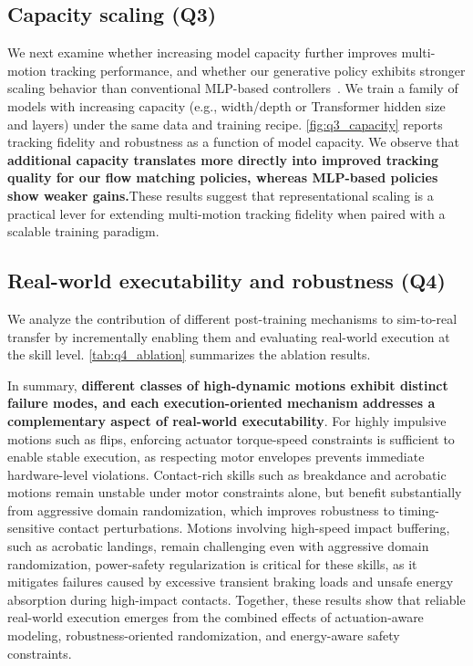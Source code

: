 

\subsection{Capacity scaling (Q3)}
\label{sec:q3_capacity}

We next examine whether increasing model capacity further improves multi-motion tracking performance, and whether our generative policy exhibits stronger scaling behavior than conventional MLP-based controllers~\cite{pan2025much}.
We train a family of models with increasing capacity (e.g., width/depth or Transformer hidden size and layers) under the same data and training recipe.
\cref{fig:q3_capacity} reports tracking fidelity and robustness as a function of model capacity.
We observe that \textbf{additional capacity translates more directly into improved tracking quality for our flow matching policies, whereas MLP-based policies show weaker gains.}These results suggest that representational scaling is a practical lever for extending multi-motion tracking fidelity when paired with a scalable training paradigm.


\subsection{Real-world executability and robustness (Q4)}
\label{sec:q4_posttrain}
We analyze the contribution of different post-training mechanisms to sim-to-real
transfer by incrementally enabling them and evaluating real-world execution at the
skill level. \cref{tab:q4_ablation} summarizes the ablation results.

In summary, \textbf{different classes of high-dynamic motions exhibit distinct failure modes,
and each execution-oriented mechanism addresses a complementary aspect of real-world
executability}. For highly impulsive motions such as flips, enforcing actuator torque-speed constraints is sufficient to enable stable execution, as respecting motor envelopes prevents
immediate hardware-level violations. Contact-rich skills such as breakdance and acrobatic motions remain unstable under motor constraints alone, but benefit substantially from aggressive domain randomization, which improves robustness to timing-sensitive contact
perturbations. Motions involving high-speed impact buffering, such as acrobatic landings,
remain challenging even with aggressive domain randomization, power-safety regularization is critical for
these skills, as it mitigates failures caused by excessive transient braking loads
and unsafe energy absorption during high-impact contacts.
Together, these results show that reliable real-world execution emerges from the
combined effects of actuation-aware modeling, robustness-oriented randomization, and
energy-aware safety constraints.


